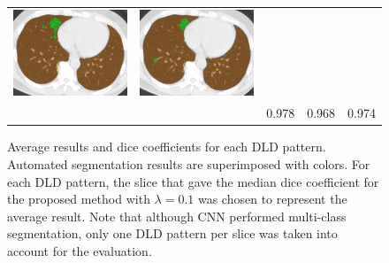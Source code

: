 \begin{figure}[htbp]
\begin{tabular}{ccccc}
\begin{minipage}[c]{.21\textwidth}
      \includegraphics[width=1\textwidth]{images/median/alpha0.1/5_0440_20070830_2_407.png}
    \end{minipage} &
    \begin{minipage}[c]{.21\textwidth}
      \centering
      \includegraphics[width=1\textwidth]{images/median/alpha1/5_0440_20070830_2_407.png}
    \end{minipage}
    \\
    & & 0.978 & 0.968 & 0.974
    \\

  \end{tabular}
  \caption{Average results and dice coefficients for each DLD pattern.
    Automated segmentation results are superimposed with colors.
    For each DLD pattern, the slice that gave the median dice coefficient for the proposed method with $\lambda=0.1$ was chosen to represent the average result.
    Note that although CNN performed multi-class segmentation, only one DLD pattern per slice was taken into account for the evaluation.}
  \label{average_results}
\end{figure}
